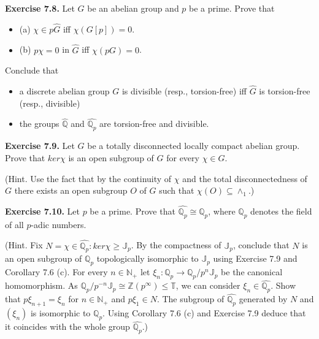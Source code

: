 \documentclass[12pt]{article}
\begin{document}
\textbf{Exercise 7.8.} Let $G$ be an abelian group and $p$ be a prime. Prove that


\begin{itemize}

    \item (a) $\chi \in p \hat{G}$ iff $\chi(G[p]) = 0$.

    \item (b) $p \chi = 0$ in $\hat{G}$ iff $\chi (pG) = 0$.

\end{itemize}


Conclude that


\begin{itemize}

    \item a discrete abelian group $G$ is divisible (resp., torsion-free) iff $\hat{G}$ is torsion-free (resp., divisible)

    \item  the groups $\hat{\mathbb{Q}}$ and $\hat{\mathbb{Q}_p}$ are torsion-free and divisible.

\end{itemize}


\textbf{Exercise 7.9.} Let $G$ be a totally disconnected locally compact abelian group. Prove that $ker \chi$ is an open
subgroup of $G$ for every $\chi \in \hat{G}$.


    (Hint. Use the fact that by the continuity of $\chi$ and the total disconnectedness of $G$ there exists an open
subgroup $O$ of $G$ such that $\chi(O) \subseteq \wedge_1$.)


\textbf{Exercise 7.10.} Let $p$ be a prime. Prove that $\hat{\mathbb{Q}_p} \cong \mathbb{Q}_p$, where $\mathbb{Q}_p$ denotes the field of all $p$-adic numbers.


    (Hint. Fix $N = {\chi \in \hat{\mathbb{Q}_p} : ker \chi \geq \mathbb{J}_p}$. By the compactness of $\mathbb{J}_p$, conclude that $N$ is an open subgroup of $\mathbb{Q}_p$
topologically isomorphic to $\mathbb{J}_p$ using Exercise 7.9 and Corollary 7.6 (c). For every $n \in \mathbb{N}_+$ let $\xi_n : \mathbb{Q}_p \to \mathbb{Q}_p/p^n \mathbb{J}_p$
be the canonical homomorphism. As $\mathbb{Q}_p/p^{-n} \mathbb{J}_p \cong \mathbb{Z}(p^{\infty}) \leq \mathbb{T}$, we can consider $\xi_n \in \hat{\mathbb{Q}_p}$. Show that $p \xi_{n+1} = \xi_n$
for $n \in \mathbb{N}_+$ and $p \xi_1 \in N$. The subgroup of $\hat{\mathbb{Q}_p}$ generated by $N$ and $(\xi_n)$ is isomorphic to $\mathbb{Q}_p$. Using Corollary
7.6 (c) and Exercise 7.9 deduce that it coincides with the whole group $\hat{\mathbb{Q}_p}$.)
\end{document}
